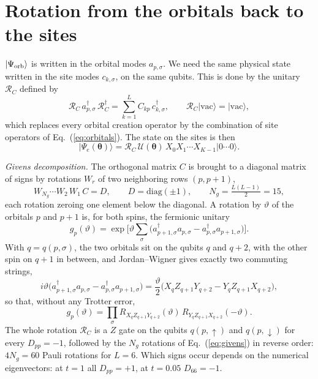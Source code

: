 \documentclass[11pt,a4paper]{article}
\newcommand{\cd}{c^\dagger}
\newcommand{\ad}{a^\dagger}
\newcommand{\up}{\uparrow}
\newcommand{\dn}{\downarrow}
\begin{document}
\section{Rotation from the orbitals back to the sites}\label{sec:rotation}

$|\Psi_{\rm orb}\rangle$ is written in the orbital modes $a_{p,\sigma}$. We need
the same physical state written in the site modes $c_{k,\sigma}$, on the same
qubits. This is done by the unitary $\mathcal{R}_C$ defined by
\begin{equation}\label{eq:rc}
  \mathcal{R}_C\, \ad_{p,\sigma}\, \mathcal{R}_C^\dagger = \sum_{k=1}^{L} C_{kp}\, \cd_{k,\sigma} , \qquad
  \mathcal{R}_C |\mathrm{vac}\rangle = |\mathrm{vac}\rangle ,
\end{equation}
which replaces every orbital creation operator by the combination of site
operators of Eq.~(\ref{eq:orbitals}). The state on the sites is then
\begin{equation}\label{eq:psi}
  |\Psi_e(\boldsymbol\theta)\rangle = \mathcal{R}_C\, \mathcal{U}(\boldsymbol\theta)\, X_0 X_1 \cdots X_{K-1} |0\cdots0\rangle .
\end{equation}

\emph{Givens decomposition.} The orthogonal matrix $C$ is brought to a diagonal
matrix of signs by rotations $W_r$ of two neighboring rows $(p, p+1)$,
\begin{equation}\label{eq:givens}
  W_{N_g} \cdots W_2\, W_1\, C = D , \qquad D = \mathrm{diag}(\pm 1) ,
  \qquad N_g = \tfrac{L(L-1)}{2} = 15 ,
\end{equation}
each rotation zeroing one element below the diagonal.
A rotation by $\vartheta$ of the orbitals $p$ and $p+1$ is, for both spins, the
fermionic unitary
\begin{equation}
  g_p(\vartheta) = \exp\!\Big[ \vartheta \sum_\sigma
     \big( \ad_{p+1,\sigma} a_{p,\sigma} - \ad_{p,\sigma} a_{p+1,\sigma} \big) \Big] .
\end{equation}
With $q = q(p,\sigma)$, the two orbitals sit on the qubits $q$ and $q+2$, with
the other spin on $q+1$ in between, and Jordan--Wigner gives exactly two
commuting strings,
\begin{equation}\label{eq:givens-jw}
  i\vartheta \big( \ad_{p+1,\sigma} a_{p,\sigma} - \ad_{p,\sigma} a_{p+1,\sigma} \big)
  = \frac{\vartheta}{2} \big( X_q Z_{q+1} Y_{q+2} - Y_q Z_{q+1} X_{q+2} \big) ,
\end{equation}
so that, without any Trotter error,
\begin{equation}
  g_p(\vartheta) = \prod_{\sigma}
    R_{X_q Z_{q+1} Y_{q+2}}(\vartheta)\, R_{Y_q Z_{q+1} X_{q+2}}(-\vartheta) .
\end{equation}
The whole rotation $\mathcal{R}_C$ is a $Z$ gate on the qubits $q(p,\up)$ and
$q(p,\dn)$ for every $D_{pp} = -1$, followed by the $N_g$ rotations of
Eq.~(\ref{eq:givens}) in reverse order: $4 N_g = 60$ Pauli rotations for
$L = 6$. Which signs occur depends on the
numerical eigenvectors: at $t = 1$ all $D_{pp} = +1$, at $t = 0.05$
$D_{66} = -1$.
\end{document}
